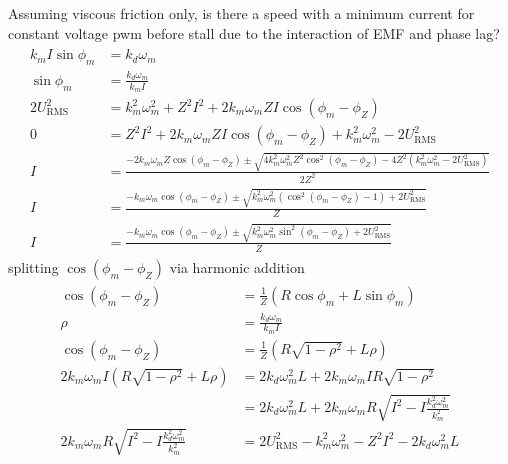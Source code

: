 \documentclass[12pt,a4paper,oneside,openany]{article}
\begin{document}
Assuming viscous friction only, is there a speed with a minimum current for constant voltage pwm before stall due to the interaction of EMF and phase lag?
\begin{gather}
\begin{aligned}
k_m I \sin \phi_m &= k_d \omega_m \\
\sin \phi_m &= \frac{k_d \omega_m}{k_m I} \\
2 U^2_{\textrm{RMS}} &= k_m^2\omega_m^2 + Z^2I^2  + 2 k_m \omega_m Z I \cos \left( \phi_m - \phi_Z \right)\\
0 & = Z^2I^2  + 2 k_m \omega_m Z I \cos \left( \phi_m - \phi_Z \right) + k_m^2\omega_m^2 - 2 U^2_{\textrm{RMS}} \\
I &= \frac{-2 k_m \omega_m Z \cos \left( \phi_m - \phi_Z \right) \pm \sqrt{4 k^2_m \omega^2_m Z^2 \cos^2 \left( \phi_m - \phi_Z \right) - 4 Z^2 \left( k_m^2\omega_m^2 - 2 U^2_{\textrm{RMS}} \right)}}{2 Z^2} \\
I &= \frac{-k_m \omega_m \cos \left( \phi_m - \phi_Z \right) \pm \sqrt{k^2_m \omega^2_m \left(\cos^2 \left( \phi_m - \phi_Z \right) - 1\right) + 2 U^2_{\textrm{RMS}} }}{Z} \\
I &= \frac{-k_m \omega_m \cos \left( \phi_m - \phi_Z \right) \pm \sqrt{k^2_m \omega^2_m \sin^2 \left( \phi_m - \phi_Z \right) + 2 U^2_{\textrm{RMS}} }}{Z}
\end{aligned}
\end{gather}
splitting $\cos \left( \phi_m - \phi_Z \right)$ via harmonic addition
\begin{gather}
\begin{aligned}
\cos \left( \phi_m - \phi_Z \right)&= \frac{1}{Z} \left( R\cos \phi_m + L \sin \phi_m \right) \\
\rho &= \frac{k_d \omega_m}{k_m I} \\
\cos \left( \phi_m - \phi_Z \right)&= \frac{1}{Z} \left( R \sqrt{1-\rho^2} + L \rho \right) \\
2 k_m \omega_m I \left( R \sqrt{1-\rho^2} + L \rho \right) &= 2 k_d \omega_m^2 L + 2 k_m \omega_m I R \sqrt{1-\rho^2}\\
&= 2 k_d \omega_m^2 L + 2 k_m \omega_m R \sqrt{I^2-I\frac{k_d^2 \omega_m^2}{k_m^2}} \\
2 k_m \omega_m R \sqrt{I^2-I\frac{k_d^2 \omega_m^2}{k_m^2}}& = 2 U^2_{\textrm{RMS}} -k_m^2\omega_m^2 - Z^2I^2  - 2 k_d \omega_m^2 L \\
\end{aligned}
\end{gather}
\end{document}
